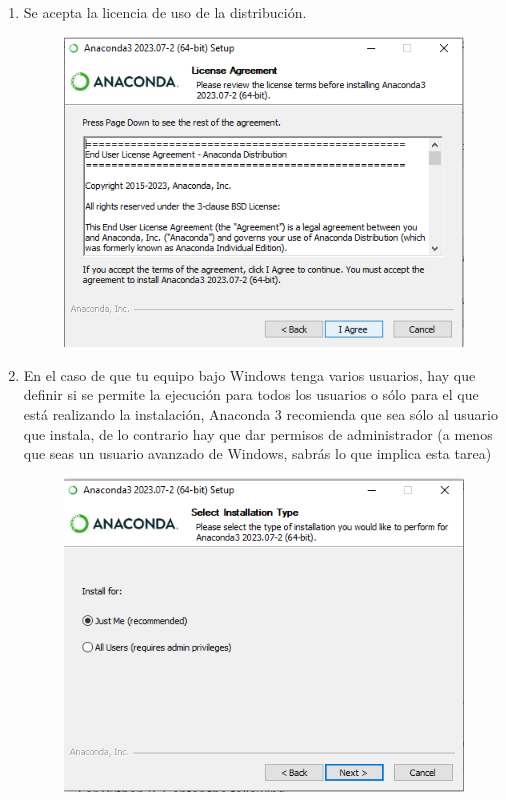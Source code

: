\documentclass[12pt]{article}
\begin{document}
\begin{enumerate}
\begin{figure}[H]
\end{figure}
\item Se acepta la licencia de uso de la distribución.
\begin{figure}[H]
	\centering
	\includegraphics[scale=0.5]{Imagenes/Nueva_Instalacion_Windows_03.png} 
\end{figure}
\item En el caso de que tu equipo bajo Windows tenga varios usuarios, hay que definir si se permite la ejecución para todos los usuarios o sólo para el que está realizando la instalación, Anaconda 3 recomienda que sea sólo al usuario que instala, de lo contrario hay que dar permisos de administrador (a menos que seas un usuario avanzado de Windows, sabrás lo que implica esta tarea)
\begin{figure}[H]
	\centering
	\includegraphics[scale=0.5]{Imagenes/Nueva_Instalacion_Windows_04.png} 

\end{figure}
\end{enumerate}
\end{document}
